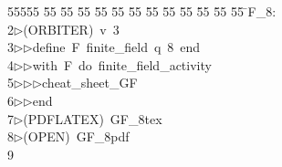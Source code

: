 %
%
\begin{tabbing}
55555 \= 55 \= 55 \= 55 \= 55 \= 55 \= 55 \= 55 \= 55 \= 55 \= 55 \= 55 \= 55 \= \>F\_8:\\[0pt]
2\>$\triangleright$\>(ORBITER)\ v\ 3\ \\[0pt]
3\>$\triangleright$\>$\triangleright$\>define\ F\ finite\_field\ q\ 8\ end\ \\[0pt]
4\>$\triangleright$\>$\triangleright$\>with\ F\ do\ finite\_field\_activity\ \\[0pt]
5\>$\triangleright$\>$\triangleright$\>$\triangleright$\>cheat\_sheet\_GF\ \\[0pt]
6\>$\triangleright$\>$\triangleright$\>end\\[0pt]
7\>$\triangleright$\>(PDFLATEX)\ GF\_8tex\\[0pt]
8\>$\triangleright$\>(OPEN)\ GF\_8pdf\\[0pt]
9\>\end{tabbing}
